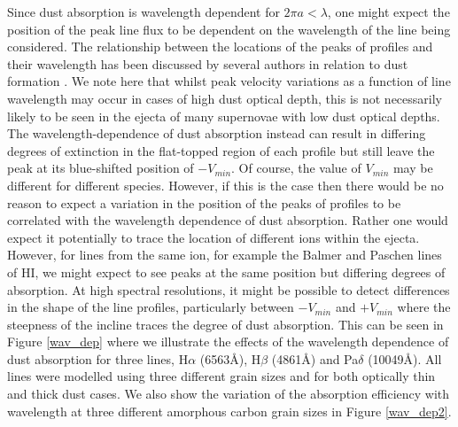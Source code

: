 \documentclass[useAMS,usenatbib,usegraphicx]{mnras}
\begin{document}
Since dust absorption is wavelength dependent for $2\pi a < \lambda$, one might expect the 
position of the peak line flux to be dependent on the wavelength of the line being 
considered.  The relationship between the locations of the peaks 
of profiles and their wavelength has been discussed by several authors in 
relation to dust formation \citep{Smith2012, Fransson2013, Gall2014}.  We 
note here that whilst peak velocity variations as a function of line wavelength 
may occur in cases of high dust 
optical depth, this is not necessarily likely to be seen in the ejecta of 
many supernovae with low dust optical depths.  The wavelength-dependence of dust absorption instead 
can result in differing degrees of extinction in the flat-topped region of 
each profile but still leave the peak at its blue-shifted position of 
$-V_{min}$.  Of course, the value of $V_{min}$ may be different for 
different species.  However, if this is the case then there would be no 
reason to expect a variation in the position of the peaks of profiles to be 
correlated with the wavelength dependence of dust absorption.  Rather one would 
expect it potentially to trace the location of different ions within the ejecta. 
However, for lines from the same ion, for example the Balmer and Paschen lines of HI,
we might expect to see peaks at the same position but differing degrees of absorption.
At high spectral resolutions, it might be possible to detect differences in the shape of the line 
profiles, particularly between $-V_{min}$ and $+V_{min}$ where the steepness of the 
incline traces the degree of dust absorption.  This can be seen in Figure \ref{wav_dep} 
where we illustrate the effects of the wavelength dependence of dust absorption for 
three lines, H$\alpha$ (6563\AA), H$\beta$ (4861\AA) and Pa$\delta$ (10049\AA).  
All lines were modelled using three different grain sizes and for both optically thin and 
thick dust cases.  We also show the variation of the absorption efficiency with 
wavelength at three different amorphous carbon grain sizes in Figure \ref{wav_dep2}.

\end{document}
